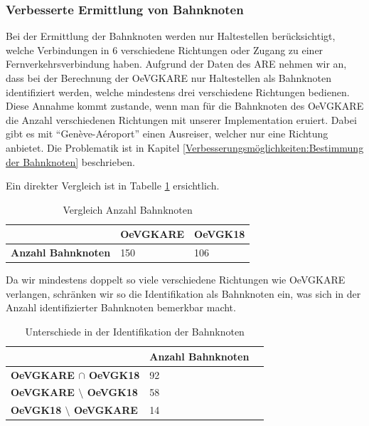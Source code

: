 \subsubsection{Verbesserte Ermittlung von Bahnknoten}
Bei der Ermittlung der Bahnknoten werden nur Haltestellen berücksichtigt, welche Verbindungen in 6 verschiedene Richtungen oder Zugang zu einer Fernverkehrsverbindung haben.
Aufgrund der Daten des \acl{ARE} nehmen wir an, dass bei der Berechnung der \gls{OeVGKARE} nur Haltestellen als Bahnknoten identifiziert werden, welche mindestens drei verschiedene Richtungen bedienen.
Diese Annahme kommt zustande, wenn man für die Bahnknoten des \gls{OeVGKARE} die Anzahl verschiedenen Richtungen mit unserer Implementation eruiert.
Dabei gibt es mit "`Genève-Aéroport"' einen Ausreiser, welcher nur eine Richtung anbietet.
Die Problematik ist in Kapitel \ref{Verbesserungsmöglichkeiten:Bestimmung der Bahnknoten} beschrieben.

Ein direkter Vergleich ist in Tabelle \ref{table:Vergleich Anzahl Bahnknoten} ersichtlich.

\begin{table}[H]
    \centering
    \begin{tabular}[c]{l l l}
        \toprule
        \textbf{}
                                & \textbf{OeVGKARE}
                                & \textbf{OeVGK18}\\
        \midrule
        \textbf{Anzahl Bahnknoten}
                                & 150
                                & 106\\
        \bottomrule
    \end{tabular}
    \caption{Vergleich Anzahl Bahnknoten}
    \label{table:Vergleich Anzahl Bahnknoten}
\end{table}

Da wir mindestens doppelt so viele verschiedene Richtungen wie OeVGKARE verlangen, schränken wir so die Identifikation als Bahnknoten ein, was sich in der Anzahl identifizierter Bahnknoten bemerkbar macht.

\begin{table}[H]
    \centering
    \begin{tabular}[c]{l l l}
        \toprule
        \textbf{}
                                            & \textbf{Anzahl Bahnknoten}\\
        \midrule
        \textbf{OeVGKARE $\cap$ OeVGK18}       & 92\\
        \textbf{OeVGKARE $\setminus$ OeVGK18}  & 58\\
        \textbf{OeVGK18 $\setminus$ OeVGKARE}  & 14\\
        \bottomrule
    \end{tabular}
    \caption{Unterschiede in der Identifikation der Bahnknoten}
    \label{table:Unterschiede in der Identifikation der Bahnknoten}
\end{table}

